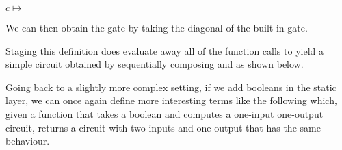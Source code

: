 \documentclass{article}
\begin{document}

\begin{minipage}{.1\textwidth}
  $c \mapsto$
\end{minipage}
\begin{minipage}{.75\textwidth}
\end{minipage}

We can then obtain the  gate by taking the diagonal
of the  built-in gate.


Staging this definition does evaluate away all of the function
calls to yield a simple circuit obtained by sequentially
composing  and  as shown below.


Going back to a slightly more complex setting, if we add booleans in the
static layer, we can once again define more interesting terms like the
following  which, given a function that takes a boolean
and computes a one-input one-output circuit, returns a circuit with two
inputs and one output that has the same behaviour.

\end{document}
